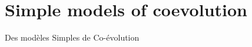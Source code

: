 

\chapter{Simple models of coevolution}{Des modèles Simples de Co-évolution}

\label{ch:coevolution} 





